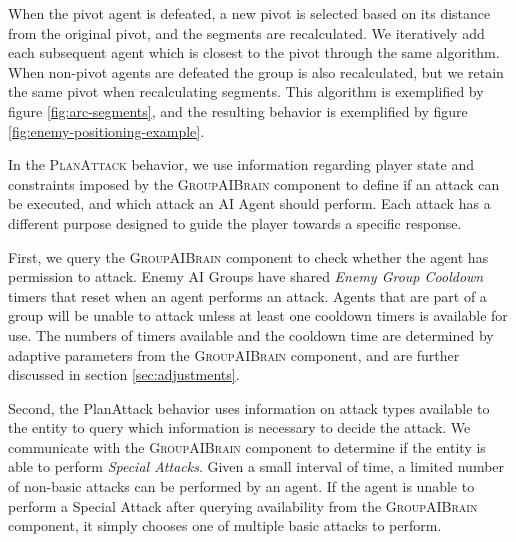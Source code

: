 When the pivot agent is defeated, a new pivot is selected based on its distance from the original pivot, and the segments are recalculated. We iteratively add each subsequent agent which is closest to the pivot through the same algorithm. When non-pivot agents are defeated the group is also recalculated, but we retain the same pivot when recalculating segments. This algorithm is exemplified by figure \ref{fig:arc-segments}, and the resulting behavior is exemplified by figure \ref{fig:enemy-positioning-example}.





In the \textsc{PlanAttack} behavior, we use information regarding player state and constraints imposed by the \textsc{GroupAIBrain} component to define if an attack can be executed, and which attack an AI Agent should perform. Each attack has a different purpose designed to guide the player towards a specific response.

First, we query the \textsc{GroupAIBrain} component to check whether the agent has permission to attack. Enemy AI Groups have shared  \emph{Enemy Group Cooldown} timers that reset when an agent performs an attack. Agents that are part of a group will be unable to attack unless at least one cooldown timers is available for use. The numbers of timers available and the cooldown time are determined by adaptive parameters from the \textsc{GroupAIBrain} component, and are further discussed in section \ref{sec:adjustments}.

Second, the PlanAttack behavior uses information on attack types available to the entity to query which information is necessary to decide the attack. We communicate with the \textsc{GroupAIBrain} component to determine if the entity is able to perform \emph{Special Attacks}. Given a small interval of time, a limited number of non-basic attacks can be performed by an agent. If the agent is unable to perform a Special Attack after querying availability from the \textsc{GroupAIBrain} component, it simply chooses one of multiple basic attacks to perform.

